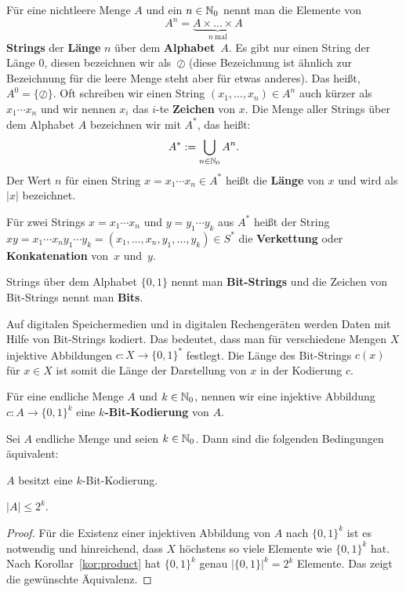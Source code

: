 \begin{defn} 
	Für eine nichtleere Menge $A$ und ein $n \in \mathbb{N}_0$ nennt man die Elemente von 
	\[
		A^n = \underbrace{A\times\ldots\times A}_{n \ \text{mal}}
	\]
	\textbf{Strings} der \textbf{Länge} $n$ über dem \textbf{Alphabet}~$A$.
	Es gibt nur einen String der Länge $0$, diesen bezeichnen wir als~$\oslash$ (diese Bezeichnung ist ähnlich zur Bezeichnung für die leere Menge steht aber für etwas anderes). 
	Das heißt, $A^0 = \{\oslash\}$. 
	Oft schreiben wir einen String $(x_1,\ldots,x_n) \in A^n$ auch kürzer als $x_1 \cdots x_n$ und wir nennen $x_i$ das $i$-te \textbf{Zeichen} von $x$. 
	Die Menge aller Strings über dem Alphabet $A$ bezeichnen wir mit $A^\ast$, das heißt: 
	\[
		A^\ast := \bigcup_{n \in \mathbb{N}_0} A^n.
	\]
	Der Wert $n$ für einen String $x = x_1 \cdots x_n \in A^\ast$ heißt die \textbf{Länge} von $x$ und wird als $|x|$ bezeichnet. 
\end{defn}

\begin{defn} 
		Für zwei Strings $x=x_1 \cdots x_n$ und $y=y_1 \cdots y_k$ aus $A^\ast$ heißt der String $xy = x_1 \cdots x_n y_1 \cdots y_k = (x_1,\ldots,x_n,y_1,\ldots,y_k) \in S^\ast$ die \textbf{Verkettung} oder \textbf{Konkatenation} von~$x$ und~$y$. 
\end{defn} 

\begin{defn} 
		Strings über dem Alphabet $\{0,1\}$ nennt man \textbf{Bit-Strings} und die Zeichen von Bit-Strings nennt man \textbf{Bits}.
\end{defn} 

\begin{bem}
	Auf digitalen Speichermedien und in digitalen Rechengeräten werden Daten mit Hilfe von Bit-Strings kodiert. Das bedeutet, dass man für verschiedene Mengen $X$ injektive Abbildungen $c : X \to \{0,1\}^\ast$ festlegt. Die Länge des Bit-Strings $c(x)$ für $x \in X$ ist somit die Länge der Darstellung von $x$ in der Kodierung $c$. 
\end{bem} 

\begin{defn}
	Für eine endliche Menge $A$ und $k \in \mathbb{N}_0$, nennen wir eine injektive Abbildung $c: A \to \{0,1\}^k$ eine \textbf{$k$-Bit-Kodierung} von $A$. 
\end{defn} 

\begin{prop}
Sei $A$ endliche Menge und seien $k \in \mathbb{N}_0$. Dann sind die folgenden Bedingungen äquivalent: 
\begin{enumi} 
	\item $A$ besitzt eine $k$-Bit-Kodierung.
	\item $ |A| \le 2^k$. 
\end{enumi} 
\end{prop} 
\begin{proof} 
	Für die Existenz einer injektiven Abbildung von $A$ nach $\{0,1\}^k$ ist es notwendig und hinreichend, dass $X$ höchstens so viele Elemente wie $\{0,1\}^k$ hat. Nach Korollar~\ref{kor:product}  hat $\{0,1\}^k$ genau $|\{0,1\}|^k = 2^k$ Elemente. Das zeigt die gewünschte Äquivalenz. 
\end{proof} 

